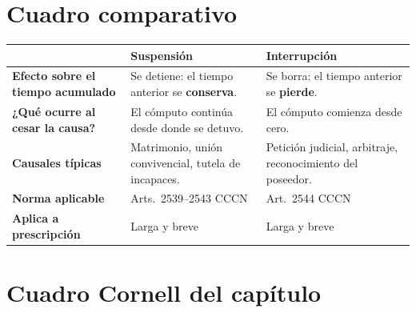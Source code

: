 \documentclass[12pt,oneside]{book}
\begin{document}
\section{Cuadro comparativo}

\begin{center}
\begin{tabularx}{\textwidth}{@{}>{\raggedright\arraybackslash}p{} >{\raggedright\arraybackslash}X >{\raggedright\arraybackslash}X@{}}
\toprule
 & \textbf{Suspensión} & \textbf{Interrupción} \\
\midrule
\textbf{Efecto sobre el tiempo acumulado} & Se detiene: el tiempo anterior se \textbf{conserva}. & Se borra: el tiempo anterior se \textbf{pierde}. \\
\textbf{¿Qué ocurre al cesar la causa?} & El cómputo continúa desde donde se detuvo. & El cómputo comienza desde cero. \\
\textbf{Causales típicas} & Matrimonio, unión convivencial, tutela de incapaces. & Petición judicial, arbitraje, reconocimiento del poseedor. \\
\textbf{Norma aplicable} & Arts.~2539--2543 CCCN & Art.~2544 CCCN \\
\textbf{Aplica a prescripción} & Larga y breve & Larga y breve \\
\bottomrule
\end{tabularx}
\end{center}

\section{Cuadro Cornell del capítulo}
\end{document}
